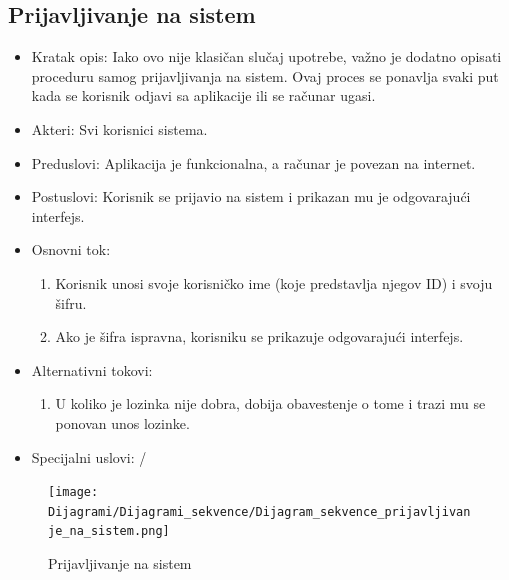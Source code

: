 \documentclass[a4paper]{article}
\begin{document}
\subsection{Prijavljivanje na sistem}
\label{subsec:prijavljivanje}

\begin{itemize}
    \item Kratak opis: Iako ovo nije klasičan slučaj upotrebe, važno je dodatno opisati proceduru samog prijavljivanja na sistem. Ovaj proces se ponavlja svaki put kada se korisnik odjavi sa aplikacije ili se računar ugasi.
    \item Akteri: Svi korisnici sistema.
    \item Preduslovi: Aplikacija je funkcionalna, a računar je povezan na internet.
    \item Postuslovi: Korisnik se prijavio na sistem i prikazan mu je odgovarajući interfejs.
    \item Osnovni tok:
        \begin{enumerate}
            \item Korisnik unosi svoje korisničko ime (koje predstavlja njegov ID) i svoju šifru.
            \item Ako je šifra ispravna, korisniku se prikazuje odgovarajući interfejs.
        \end{enumerate}
    \item Alternativni tokovi:
     \begin{enumerate}
            \item  U koliko je lozinka nije dobra, dobija obavestenje o tome i trazi mu se ponovan unos lozinke.
    \end{enumerate}
    \item Specijalni uslovi: /
\end{itemize}

\begin{figure}[H]
\begin{center}
\texttt{[image: Dijagrami/Dijagrami\_sekvence/Dijagram\_sekvence\_prijavljivanje\_na\_sistem.png]}
\end{center}
\caption{Prijavljivanje na sistem}
\label{fig:prijavljivanje}
\end{figure}
\end{document}
